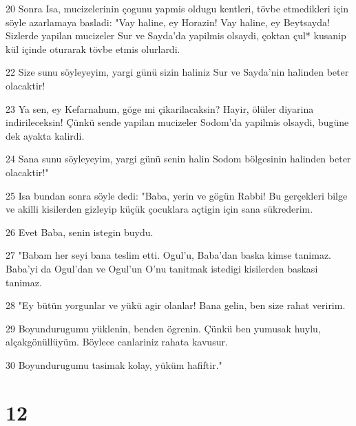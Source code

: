 \par 20 Sonra Isa, mucizelerinin çogunu yapmis oldugu kentleri, tövbe etmedikleri için söyle azarlamaya basladi: "Vay haline, ey Horazin! Vay haline, ey Beytsayda! Sizlerde yapilan mucizeler Sur ve Sayda'da yapilmis olsaydi, çoktan çul* kusanip kül içinde oturarak tövbe etmis olurlardi.
\par 22 Size sunu söyleyeyim, yargi günü sizin haliniz Sur ve Sayda'nin halinden beter olacaktir!
\par 23 Ya sen, ey Kefarnahum, göge mi çikarilacaksin? Hayir, ölüler diyarina indirileceksin! Çünkü sende yapilan mucizeler Sodom'da yapilmis olsaydi, bugüne dek ayakta kalirdi.
\par 24 Sana sunu söyleyeyim, yargi günü senin halin Sodom bölgesinin halinden beter olacaktir!"
\par 25 Isa bundan sonra söyle dedi: "Baba, yerin ve gögün Rabbi! Bu gerçekleri bilge ve akilli kisilerden gizleyip küçük çocuklara açtigin için sana sükrederim.
\par 26 Evet Baba, senin istegin buydu.
\par 27 "Babam her seyi bana teslim etti. Ogul'u, Baba'dan baska kimse tanimaz. Baba'yi da Ogul'dan ve Ogul'un O'nu tanitmak istedigi kisilerden baskasi tanimaz.
\par 28 "Ey bütün yorgunlar ve yükü agir olanlar! Bana gelin, ben size rahat veririm.
\par 29 Boyundurugumu yüklenin, benden ögrenin. Çünkü ben yumusak huylu, alçakgönüllüyüm. Böylece canlariniz rahata kavusur.
\par 30 Boyundurugumu tasimak kolay, yüküm hafiftir."

\chapter{12}

